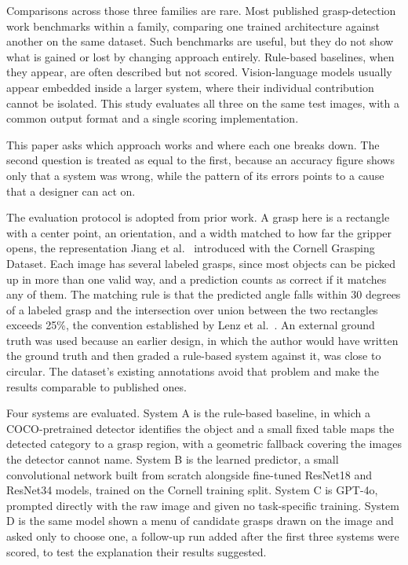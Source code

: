 \documentclass[12pt,letterpaper]{article}
\begin{document}
Comparisons across those three families are rare. Most published
grasp-detection work benchmarks within a family, comparing one trained
architecture against another on the same dataset. Such benchmarks are
useful, but they do not show what is gained or lost by changing approach
entirely. Rule-based baselines, when they appear, are often described
but not scored. Vision-language models usually appear embedded inside a
larger system, where their individual contribution cannot be isolated.
This study evaluates all three on the same test images, with a common
output format and a single scoring implementation.

This paper asks which approach works and where each one breaks down. The
second question is treated as equal to the first, because an accuracy
figure shows only that a system was wrong, while the pattern of its
errors points to a cause that a designer can act on.

The evaluation protocol is adopted from prior work. A grasp here is a
rectangle with a center point, an orientation, and a width matched to
how far the gripper opens, the representation Jiang et
al.~\cite{jiang2011} introduced with the Cornell Grasping Dataset. Each
image has several labeled grasps, since most objects can be picked up in
more than one valid way, and a prediction counts as correct if it
matches any of them. The matching rule is that the predicted angle falls
within 30 degrees of a labeled grasp and the intersection over union
between the two rectangles exceeds 25\%, the convention established by
Lenz et al.~\cite{lenz2015}. An external ground truth was used because
an earlier design, in which the author would have written the ground
truth and then graded a rule-based system against it, was close to
circular. The dataset's existing annotations avoid that problem and make
the results comparable to published ones.

Four systems are evaluated. System A is the rule-based baseline, in
which a COCO-pretrained detector identifies the object and a small fixed
table maps the detected category to a grasp region, with a geometric
fallback covering the images the detector cannot name. System B is the
learned predictor, a small convolutional network built from scratch
alongside fine-tuned ResNet18 and ResNet34 models, trained on the
Cornell training split. System C is GPT-4o, prompted directly with the
raw image and given no task-specific training. System D is the same
model shown a menu of candidate grasps drawn on the image and asked only
to choose one, a follow-up run added after the first three systems were
scored, to test the explanation their results suggested.
\end{document}
